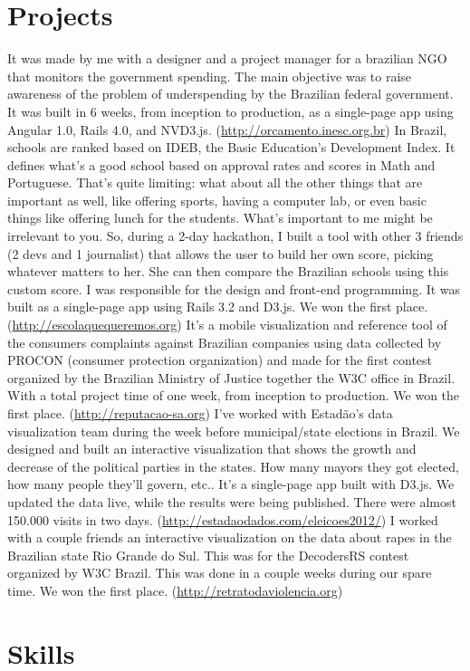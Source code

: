 \documentclass[11pt,a4paper]{moderncv}
\begin{document}
\section{Projects}
{\small 
  It was made by me with a designer and a project manager for a brazilian
  NGO that monitors the government spending. The main objective was to raise
  awareness of the problem of underspending by the Brazilian federal
  government. It was built in 6 weeks, from inception to production, as a
  single-page app using Angular 1.0, Rails 4.0, and NVD3.js.
  (\url{http://orcamento.inesc.org.br})
}
{\small 
  In Brazil, schools are ranked based on IDEB, the Basic Education's
  Development Index. It defines what's a good school based on approval rates
  and scores in Math and Portuguese. That's quite limiting: what about all the
  other things that are important as well, like offering sports, having a
  computer lab, or even basic things like offering lunch for the students.
  What's important to me might be irrelevant to you. So, during a 2-day
  hackathon, I built a tool with other 3 friends (2 devs and 1 journalist) that
  allows the user to build her own score, picking whatever matters to her. She
  can then compare the Brazilian schools using this custom score. I was
  responsible for the design and front-end programming. It was built as a
  single-page app using Rails 3.2 and D3.js. We won the first place.
  (\url{http://escolaquequeremos.org})
}
{\small 
  It's a mobile visualization and reference tool of the consumers
  complaints against Brazilian companies using data collected by PROCON
  (consumer protection organization) and made for the first contest organized
  by the Brazilian Ministry of Justice together the W3C office in Brazil. With
  a total project time of one week, from inception to production. We won the
  first place.
  (\url{http://reputacao-sa.org})
}
{\small
  I've worked with Estadão's data visualization team during the week
  before municipal/state elections in Brazil. We designed and built an
  interactive visualization that shows the growth and decrease of the political
  parties in the states. How many mayors they got elected, how many people
  they'll govern, etc..
  It's a single-page app built with D3.js. We updated the data live, while the
  results were being published. There were almost 150.000 visits in two days.
  (\url{http://estadaodados.com/eleicoes2012/})
}
{\small
  I worked with a couple friends an interactive visualization on the data about
  rapes in the Brazilian state Rio Grande do Sul. This was for the DecodersRS
  contest organized by W3C Brazil. This was done in a couple weeks during our
  spare time. We won the first place.
  (\url{http://retratodaviolencia.org})
}

\vspace{.4in}\section{Skills}
 {}{}
 {}{}
\end{document}

